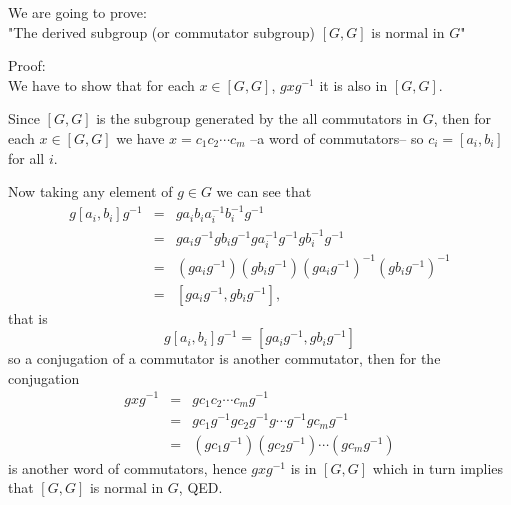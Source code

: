 \documentclass[12pt]{article}
\begin{document}
We are going to prove:\\
"The derived subgroup (or commutator subgroup) $[G,G]$ is normal in $G$"

Proof:\\
We have to show that for each $x\in[G,G]$, $gxg^{-1}$ it is also in $[G,G]$.

Since $[G,G]$ is the subgroup generated by the all commutators in $G$, then for each $x\in[G,G]$ we have $x=c_1c_2\cdots c_m$ --a word of commutators-- so $c_i=[a_i,b_i]$ for all $i$. 

Now taking any element of $g\in G$ we can see that
\begin{eqnarray*}
g[a_i,b_i]g^{-1} &=& ga_ib_ia_i^{-1}b_i^{-1}g^{-1} \\
&=& ga_ig^{-1} gb_ig^{-1} ga_i^{-1}g^{-1} gb_i^{-1}g^{-1} \\
&=& (ga_ig^{-1})(gb_ig^{-1})(ga_ig^{-1})^{-1}(gb_ig^{-1})^{-1} \\
&=& [ga_ig^{-1},gb_ig^{-1}],
\end{eqnarray*}
that is 
$$g[a_i,b_i]g^{-1}=[ga_ig^{-1},gb_ig^{-1}]$$
so a conjugation of a commutator is another commutator, then
for the conjugation 
\begin{eqnarray*}
gxg^{-1}&=&gc_1c_2\cdots c_mg^{-1}\\
&=&gc_1g^{-1}gc_2g^{-1}g\cdots g^{-1}gc_mg^{-1}\\
&=&(gc_1g^{-1})(gc_2g^{-1})\cdots (gc_mg^{-1})
\end{eqnarray*}
is another word of commutators, hence $gxg^{-1}$ is in $[G,G]$ which in turn implies that $[G,G]$ is normal in $G$, QED.
  
\end{document}
